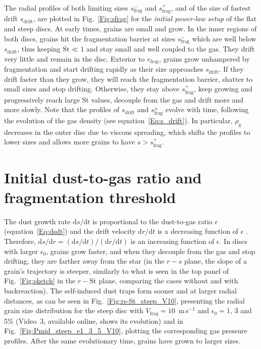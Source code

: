 \documentclass[a4paper,fleqn,usenatbib]{mnras}
\newcommand{\Vfrag}{V_\mathrm{frag}}  %
\newcommand{\St}{\mathrm{St}}         %
\begin{document}
The radial profiles of both limiting sizes $s_\mathrm{frag}^-$ and $s_\mathrm{frag}^+$, and of the size of fastest drift $s_\mathrm{drift}$, are plotted in Fig.~\ref{Fig:sfrag} for the \textit{initial power-law setup} of the flat and steep discs. At early times, grains are small and grow. In the inner regions of both discs, grains hit the fragmentation barrier at sizes $s_\mathrm{frag}^-$ which are well below $s_\mathrm{drift}$, thus keeping $\St\ll1$ and stay small and well coupled to the gas. They drift very little and remain in the disc. Exterior to $r_\mathrm{frag}$, grains grow unhampered by fragmentation and start drifting rapidly as their size approaches $s_\mathrm{drift}$. If they drift faster than they grow, they will reach the fragmentation barrier, shatter to small sizes and stop drifting. Otherwise, they stay above $s_\mathrm{frag}^+$, keep growing and progressively reach large $\St$ values, decouple from the gas and drift more and more slowly. Note that the profiles of $s_\mathrm{drift}$ and $s_\mathrm{frag}^\pm$ evolve with time, following the evolution of the gas %
density (see equation~\ref{Eq:s_drift}). In particular, %
$\rho_\mathrm{g}$ decreases in the outer disc due to viscous spreading, which shifts the profiles to lower sizes and allows more grains to have $s>s_\mathrm{frag}^+$.

\section{Initial dust-to-gas ratio and fragmentation threshold}
\label{app:Varying}

The dust growth rate $\mathrm{d}s/\mathrm{d}t$ is proportional to the dust-to-gas ratio $\epsilon$ (equation~\ref{Eq:dsdt}) and the drift velocity $\mathrm{d}r/\mathrm{d}t$ is a decreasing function of $\epsilon$ \citep{Nakagawa1986}. Therefore, $\mathrm{d}s/\mathrm{d}r=(\mathrm{d}s/\mathrm{d}t)/(\mathrm{d}r/\mathrm{d}t)$ is an increasing function of $\epsilon$. In discs with larger $\epsilon_0$, grains grow faster, and when they decouple from the gas and stop drifting, they are farther away from the star (in the $r-s$ plane, the slope of a grain's trajectory is steeper, similarly to what is seen in the top panel of Fig.~\ref{Fig:sketch} in the $r-\St$ plane, comparing the cases without and with backreaction). The self-induced dust traps form sooner and at larger radial distances, as can be seen in Fig.~\ref{Fig:rs-St_steep_V10}, presenting the radial grain size distribution for the steep disc with $\Vfrag=10$~m\,s$^{-1}$ and $\epsilon_0=1$, 3 and 5\% (Video~3, available online, shows its evolution) and in Fig.~\ref{Fig:Pmid_steep_e1_3_5_V10}, plotting the corresponding gas pressure profiles. After the same evolutionary time, grains have grown to larger sizes.
\end{document}
